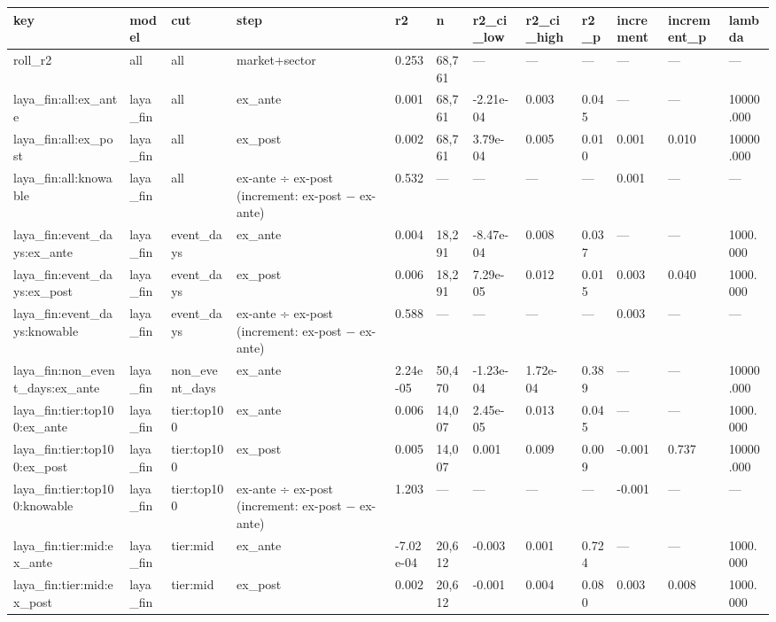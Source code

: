 \begin{tabular}{llllllllllll}
\toprule
key & model & cut & step & r2 & n & r2\_ci\_low & r2\_ci\_high & r2\_p & increment & increment\_p & lambda \\
\midrule
roll\_r2 & all & all & market+sector & 0.253 & 68,761 & — & — & — & — & — & — \\
laya\_fin:all:ex\_ante & laya\_fin & all & ex\_ante & 0.001 & 68,761 & -2.21e-04 & 0.003 & 0.045 & — & — & 10000.000 \\
laya\_fin:all:ex\_post & laya\_fin & all & ex\_post & 0.002 & 68,761 & 3.79e-04 & 0.005 & 0.010 & 0.001 & 0.010 & 10000.000 \\
laya\_fin:all:knowable & laya\_fin & all & ex-ante ÷ ex-post (increment: ex-post − ex-ante) & 0.532 & — & — & — & — & 0.001 & — & — \\
laya\_fin:event\_days:ex\_ante & laya\_fin & event\_days & ex\_ante & 0.004 & 18,291 & -8.47e-04 & 0.008 & 0.037 & — & — & 1000.000 \\
laya\_fin:event\_days:ex\_post & laya\_fin & event\_days & ex\_post & 0.006 & 18,291 & 7.29e-05 & 0.012 & 0.015 & 0.003 & 0.040 & 1000.000 \\
laya\_fin:event\_days:knowable & laya\_fin & event\_days & ex-ante ÷ ex-post (increment: ex-post − ex-ante) & 0.588 & — & — & — & — & 0.003 & — & — \\
laya\_fin:non\_event\_days:ex\_ante & laya\_fin & non\_event\_days & ex\_ante & 2.24e-05 & 50,470 & -1.23e-04 & 1.72e-04 & 0.389 & — & — & 10000.000 \\
laya\_fin:tier:top100:ex\_ante & laya\_fin & tier:top100 & ex\_ante & 0.006 & 14,007 & 2.45e-05 & 0.013 & 0.045 & — & — & 1000.000 \\
laya\_fin:tier:top100:ex\_post & laya\_fin & tier:top100 & ex\_post & 0.005 & 14,007 & 0.001 & 0.009 & 0.009 & -0.001 & 0.737 & 10000.000 \\
laya\_fin:tier:top100:knowable & laya\_fin & tier:top100 & ex-ante ÷ ex-post (increment: ex-post − ex-ante) & 1.203 & — & — & — & — & -0.001 & — & — \\
laya\_fin:tier:mid:ex\_ante & laya\_fin & tier:mid & ex\_ante & -7.02e-04 & 20,612 & -0.003 & 0.001 & 0.724 & — & — & 1000.000 \\
laya\_fin:tier:mid:ex\_post & laya\_fin & tier:mid & ex\_post & 0.002 & 20,612 & -0.001 & 0.004 & 0.080 & 0.003 & 0.008 & 1000.000 \\

\end{tabular}
